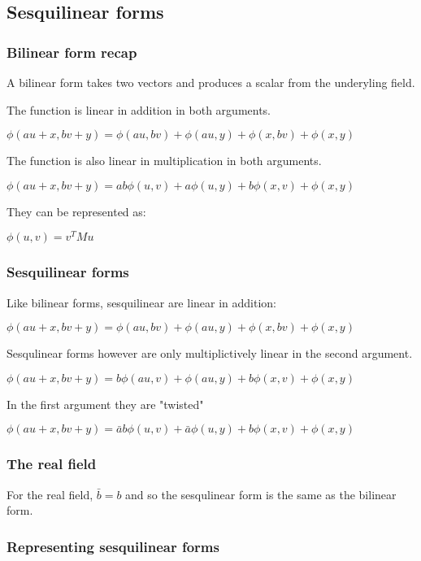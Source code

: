 
\subsection{Sesquilinear forms}

\subsubsection{Bilinear form recap}

A bilinear form takes two vectors and produces a scalar from the underyling field.

The function is linear in addition in both arguments.

\(\phi (au+x, bv+y)=\phi (au,bv)+\phi (au,y)+\phi (x,bv)+\phi (x,y)\)

The function is also linear in multiplication in both arguments.

\(\phi (au+x, bv+y)=ab\phi (u,v)+a\phi (u,y)+b\phi (x,v)+\phi (x,y)\)

They can be represented as:

\(\phi (u,v)=v^TMu\)

\subsubsection{Sesquilinear forms}

Like bilinear forms, sesquilinear are linear in addition:

\(\phi (au+x, bv+y)=\phi (au,bv)+\phi (au,y)+\phi (x,bv)+\phi (x,y)\)

Sesqulinear forms however are only multiplictively linear in the second argument.

\(\phi (au+x, bv+y)=b\phi (au,v)+\phi (au,y)+b\phi (x,v)+\phi (x,y)\)

In the first argument they are "twisted"

\(\phi (au+x, bv+y)=\bar ab\phi (u,v)+\bar a\phi (u,y)+b\phi (x,v)+\phi (x,y)\)

\subsubsection{The real field}

For the real field, \(\bar b = b\) and so the sesqulinear form is the same as the bilinear form.

\subsubsection{Representing sesquilinear forms}

